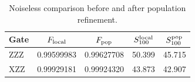 \begin{table}[t]
\centering
\caption{Noiseless comparison before and after population refinement.}
\label{tab:population_refinement}
\small
\begin{tabular}{lcccc}
\toprule
Gate & $F_{\rm local}$ & $F_{\rm pop}$ & $S_{100}^{\rm local}$ & $S_{100}^{\rm pop}$ \\
\midrule
ZZZ & 0.99599983 & 0.99627708 & 50.399 & 45.715 \\
XZZ & 0.99929181 & 0.99924320 & 43.873 & 42.907 \\
\bottomrule
\end{tabular}
\end{table}
